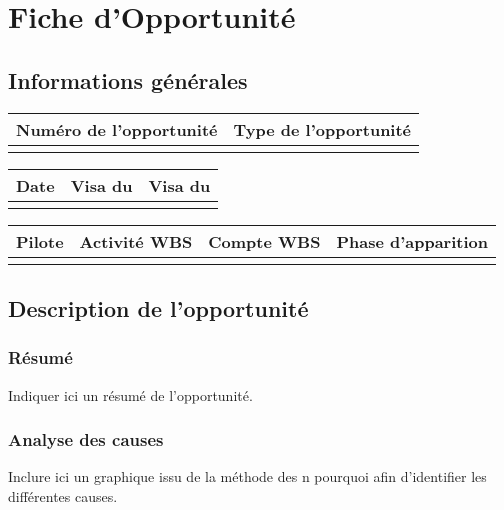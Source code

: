 
\section*{Fiche d'Opportunité}

\subsection*{Informations générales}
 
\begin{table}[H]
\centering
	\begin{tabularx}{16.8cm}{|X|X|}
	\hline
	\rowcolor{gray!40} Numéro de l'opportunité & Type de l'opportunité \\
	\hline
	 &  \\
	\hline
	\end{tabularx}
\end{table}

\begin{table}[H]
\centering
	\begin{tabularx}{16.8cm}{|X|X|X|}
	\hline
	\rowcolor{gray!40} Date & Visa du \RQ & Visa du \CP \\
	\hline
	  & & \\
	\hline
	\end{tabularx}
\end{table}

\begin{table}[H]
\centering
	\begin{tabularx}{16.8cm}{|X|X|X|X|}
	\hline
	\rowcolor{gray!40} Pilote & Activité WBS & Compte WBS & Phase d'apparition \\
	\hline
	  & & &\\
	\hline
	\end{tabularx}
\end{table}

\subsection*{Description de l'opportunité}

\subsubsection*{Résumé}
	Indiquer ici un résumé de l'opportunité.
	
\subsubsection*{Analyse des causes}
	Inclure ici un graphique issu de la méthode des n pourquoi afin d'identifier les différentes causes.


